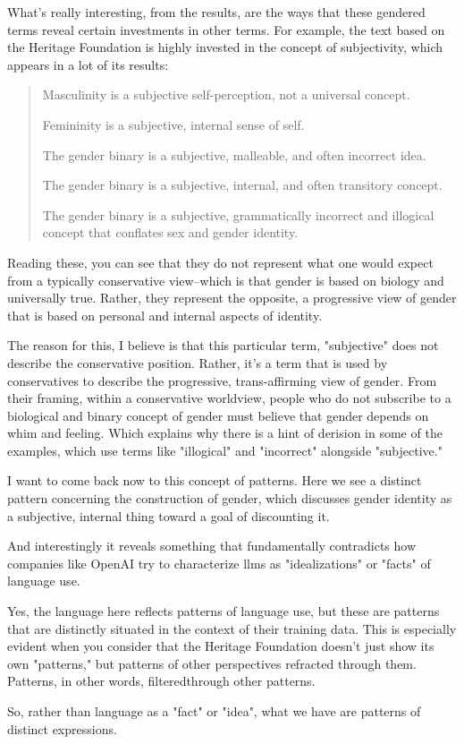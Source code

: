 \documentclass[11pt]{article}
\begin{document}
What's really interesting, from the results, are the ways that these
gendered terms reveal certain investments in other terms. For example,
the text based on the Heritage Foundation is highly invested in the
concept of subjectivity, which appears in a lot of its results:

\begin{quote}
Masculinity is a subjective self-perception, not a universal
concept.

Femininity is a subjective, internal sense of self.

The gender binary is a subjective, malleable, and often incorrect
idea.

The gender binary is a subjective, internal, and often transitory
concept.

The gender binary is a subjective, grammatically incorrect and
illogical concept that conflates sex and gender identity.
\end{quote}

Reading these, you can see that they do not represent what one would
expect from a typically conservative view--which is that gender is
based on biology and universally true. Rather, they represent the
opposite, a progressive view of gender that is based on personal and
internal aspects of identity.

The reason for this, I believe is that this particular term,
"subjective" does not describe the conservative position. Rather, it's
a term that is used by conservatives to describe the progressive,
trans-affirming view of gender. From their framing, within a
conservative worldview, people who do not subscribe to a biological
and binary concept of gender must believe that gender depends on whim
and feeling. Which explains why there is a hint of derision in some of
the examples, which use terms like "illogical" and "incorrect"
alongside "subjective."

I want to come back now to this concept of patterns. Here we see a
distinct pattern concerning the construction of gender, which
discusses gender identity as a subjective, internal thing toward a
goal of discounting it.

And interestingly it reveals something that fundamentally contradicts
how companies like OpenAI try to characterize llms as "idealizations"
or "facts" of language use. 

Yes, the language here reflects patterns of language use, but these
are patterns that are distinctly situated in the context of their
training data. This is especially evident when you consider that the
Heritage Foundation doesn't just show its own "patterns," but patterns
of other perspectives refracted through them. Patterns, in other
words, filteredthrough other patterns.

So, rather than language as a "fact" or "idea", what we have are
patterns of distinct expressions. 
\end{document}
